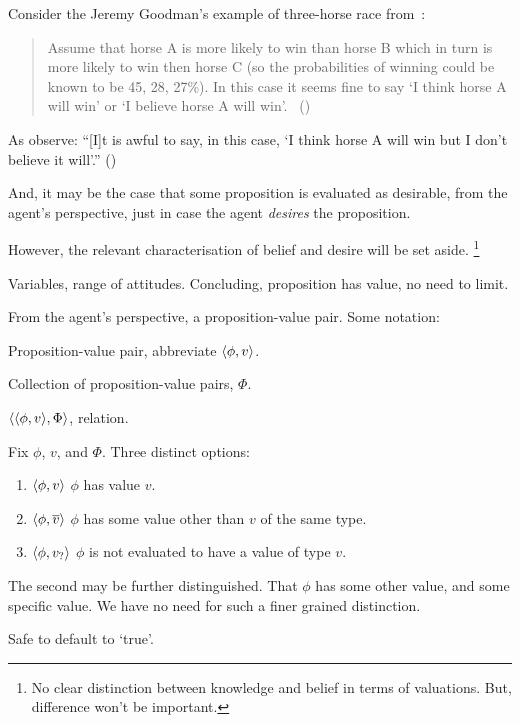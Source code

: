 \begin{note}
{    Consider the Jeremy Goodman's example of three-horse race from~\textcite{Hawthorne:2016wv}:
    \begin{quote}
      Assume that horse A is more likely to win than horse B which in turn is more likely to win then horse C (so the probabilities of winning could be known to be 45, 28, 27\%).
      In this case it seems ﬁne to say `I think horse A will win' or `I believe horse A will win'.%
      \mbox{ }\hfill\mbox{(\citeyear[1440]{Hawthorne:2016wv})}
    \end{quote}
    As \citeauthor{Hawthorne:2016wv} observe: ``[I]t is awful to say, in this case, `I think horse A will win but I don't believe it will'.''
    (\citeyear[1440, fn.17]{Hawthorne:2016wv})
  }
  And, it may be the case that some proposition is evaluated as desirable, from the agent's perspective, just in case the agent \emph{desires} the proposition.

  However, the relevant characterisation of belief and desire will be set aside.%
  \footnote{
    No clear distinction between knowledge and belief in terms of valuations.
    But, difference won't be important.
  }

  Variables, range of attitudes.
  Concluding, proposition has value, no need to limit.
\end{note}

\begin{note}
  From the agent's perspective, a proposition-value pair.
  Some notation:

  \begin{notation}
    Proposition-value pair, abbreviate \(\langle \phi, v \rangle\).

    Collection of proposition-value pairs, \(\Phi\).

    \(\langle \langle \phi, v \rangle, \Phi \rangle\), relation.
  \end{notation}

  \begin{notation}
    Fix \(\phi\), \(v\), and \(\Phi\).
    Three distinct options:
    \begin{enumerate}
    \item
      \(\langle \phi, v \rangle\) \hfill \(\phi\) has value \(v\).
    \item
      \(\langle \phi, \overline{v} \rangle\) \hfill \(\phi\) has some value other than \(v\) of the same type.
    \item
      \(\langle \phi, v_{?} \rangle\) \hfill \(\phi\) is not evaluated to have a value of type \(v\).
    \end{enumerate}
  \end{notation}

  The second may be further distinguished.
  That \(\phi\) has some other value, and some specific value.
  We have no need for such a finer grained distinction.

  Safe to default to `true'.
\end{note}


